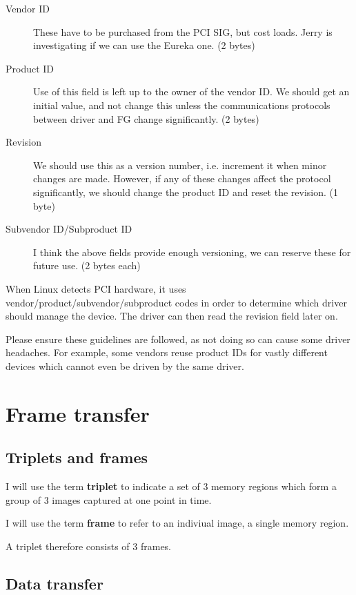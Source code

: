 \documentclass[12pt]{article}
\begin{document}
\begin{description}
\item[Vendor ID] These have to be purchased from the PCI SIG, but cost loads. Jerry is investigating if we can use the Eureka one. (2 bytes)
\item[Product ID] Use of this field is left up to the owner of the vendor ID. We should get an initial value, and not change this unless the communications protocols between driver and FG change significantly. (2 bytes)
\item[Revision] We should use this as a version number, i.e. increment it when minor changes are made. However, if any of these changes affect the protocol significantly, we should change the product ID and reset the revision. (1 byte)
\item[Subvendor ID/Subproduct ID] I think the above fields provide enough versioning, we can reserve these for future use. (2 bytes each)
\end{description}

When Linux detects PCI hardware, it uses vendor/product/subvendor/subproduct codes in order to determine which driver should manage the device. The driver can then read the revision field later on.

Please ensure these guidelines are followed, as not doing so can cause some driver headaches. For example, some vendors reuse product IDs for vastly different devices which cannot even be driven by the same driver.

\section{Frame transfer}

\subsection{Triplets and frames}

I will use the term \textbf{triplet} to indicate a set of 3 memory regions which form a group of 3 images captured at one point in time.

I will use the term \textbf{frame} to refer to an indiviual image, a single memory region.

A triplet therefore consists of 3 frames.

\subsection{Data transfer}
\end{document}
